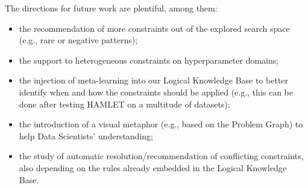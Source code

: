 \documentclass[5p,times]{elsarticle}
\newcommand{\mf}[1]{#1}
\begin{document}
\mf{
The directions for future work are plentiful, among them:
\begin{itemize}
    \item[(i)] the recommendation of more constraints out of the explored search space (e.g., rare or negative patterns);
    \item[(ii)] the support to heterogeneous constraints on hyperparameter domains;
    \item[(iii)] the injection of meta-learning into our Logical Knowledge Base to better identify when and how the constraints should be applied (e.g., this can be done after testing HAMLET on a multitude of datasets);
    \item[(iv)] the introduction of a visual metaphor (e.g., based on the Problem Graph) to help Data Scientists' understanding;
    \item[(v)] the study of automatic resolution/recommendation of conflicting constraints, also depending on the rules already embedded in the Logical Knowledge Base.
\end{itemize}
}


 
\balance

\end{document}
